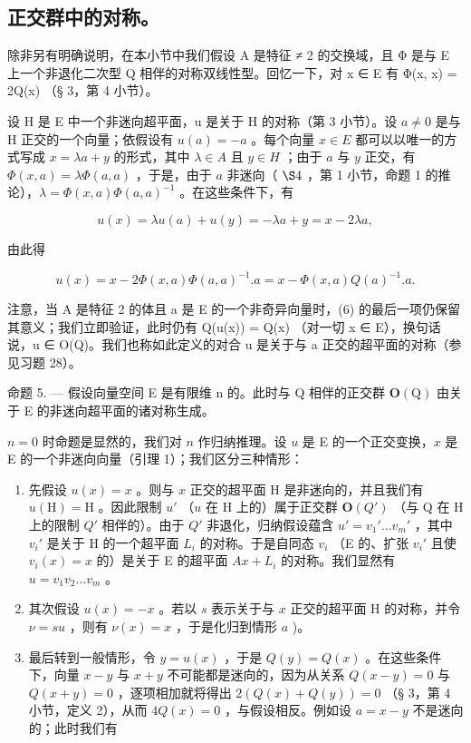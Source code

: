 \subsection{正交群中的对称。}

除非另有明确说明，在本小节中我们假设 A 是特征 ≠ 2 的交换域，且 Φ 是与 E 上一个非退化二次型 Q 相伴的对称双线性型。回忆一下，对 x ∈ E 有 Φ(x, x) = 2Q(x) （§ 3，第 4 小节）。

设 H 是 E 中一个非迷向超平面，u 是关于 H 的对称（第 3 小节）。设 \(a \neq 0\) 是与 H 正交的一个向量；依假设有 \(u(a) = -a\) 。每个向量 \(x \in E\) 都可以以唯一的方式写成 \(x = \lambda a + y\) 的形式，其中 \(\lambda \in A\) 且 \(y \in H\) ；由于 \(a\) 与 \(y\) 正交，有 \(\Phi(x, a) = \lambda \Phi(a, a)\) ，于是，由于 \(a\) 非迷向（ \(\S 4\) ，第 1 小节，命题 1 的推论），\(\lambda = \Phi(x, a) \Phi(a, a)^{-1}\) 。在这些条件下，有

\[
u (x) = \lambda u (a) + u (y) = - \lambda a + y = x - 2 \lambda a,
\]

由此得

\[
u (x) = x - 2 \Phi (x, a) \Phi (a, a) ^ {- 1}. a = x - \Phi (x, a) Q (a) ^ {- 1}. a.\tag{6}
\]

注意，当 A 是特征 2 的体且 a 是 E 的一个非奇异向量时，(6) 的最后一项仍保留其意义；我们立即验证，此时仍有 Q(u(x)) = Q(x) （对一切 x ∈ E），换句话说，u ∈ O(Q)。我们也称如此定义的对合 u 是关于与 a 正交的超平面的对称（参见习题 28）。

命题 5. --- 假设向量空间 E 是有限维 n 的。此时与 Q 相伴的正交群 \(\mathbf{O}(\mathrm{Q})\) 由关于 E 的非迷向超平面的诸对称生成。

\(n=0\) 时命题是显然的，我们对 \(n\) 作归纳推理。设 \(u\) 是 E 的一个正交变换，\(x\) 是 E 的一个非迷向向量（引理 1）；我们区分三种情形：

\begin{enumerate}
\def\labelenumi{\alph{enumi})}
\item
  先假设 \(u(x) = x\) 。则与 \(x\) 正交的超平面 H 是非迷向的，并且我们有 \(u(\mathrm{H}) = \mathrm{H}\) 。因此限制 \(u'\) （\(u\) 在 H 上的）属于正交群 \(\mathbf{O}(Q')\) （与 Q 在 H 上的限制 \(Q'\) 相伴的）。由于 \(Q'\) 非退化，归纳假设蕴含 \(u' = v_1' \ldots v_m'\) ，其中 \(v_i'\) 是关于 H 的一个超平面 \(L_i\) 的对称。于是自同态 \(v_i\) （E 的、扩张 \(v_i'\) 且使 \(v_i(x) = x\) 的）是关于 E 的超平面 \(Ax + L_i\) 的对称。我们显然有 \(u = v_1v_2 \ldots v_m\) 。
\item
  其次假设 \(u(x) = -x\) 。若以 \(s\) 表示关于与 \(x\) 正交的超平面 H 的对称，并令 \(\nu = su\) ，则有 \(\nu(x) = x\) ，于是化归到情形 \(a\) )。
\item
  最后转到一般情形，令 \(y = u(x)\) ，于是 \(Q(y) = Q(x)\) 。在这些条件下，向量 \(x - y\) 与 \(x + y\) 不可能都是迷向的，因为从关系 \(Q(x - y) = 0\) 与 \(Q(x + y) = 0\) ，逐项相加就将得出 \(2(Q(x) + Q(y)) = 0\) （§ 3，第 4 小节，定义 2），从而 \(4Q(x) = 0\) ，与假设相反。例如设 \(a = x - y\) 不是迷向的；此时我们有
\end{enumerate}

